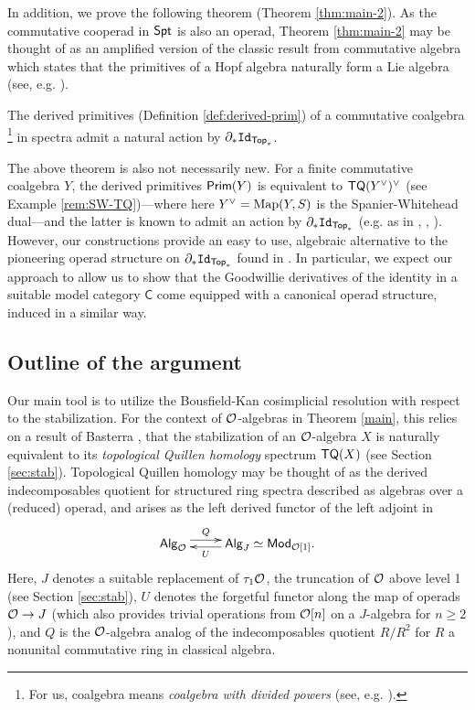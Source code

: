 In addition, we prove the following theorem (Theorem \ref{thm:main-2}). As the commutative cooperad in $\mathsf{Spt}$ is also an operad, Theorem \ref{thm:main-2} may be thought of as an amplified version of the classic result from commutative algebra which states that the primitives of a Hopf algebra naturally form a Lie algebra (see, e.g. \cite{Abe}). 

\begin{theorem} \label{thm:main-2}
    The derived primitives (Definition \ref{def:derived-prim}) of a commutative coalgebra \footnote{For us, coalgebra means \textit{coalgebra with divided powers} (see, e.g. \cite{FG}).} in spectra admit a natural action by $\partial_*\mathtt{Id}_{\mathsf{Top}_*}$. 
\end{theorem}

The above theorem is also not necessarily new. For a finite commutative coalgebra $Y$, the derived primitives $\operatorname{\mathsf{Prim}}(Y)$ is equivalent to $\mathsf{TQ}(Y^{\vee})^{\vee}$ (see Example \ref{rem:SW-TQ})---where here $Y^{\vee}=\operatorname{Map}(Y,S)$ is the Spanier-Whitehead dual---and the latter is known to admit an action by $\partial_* \mathtt{Id}_{\mathsf{Top}_*}$ (e.g. as in \cite{Ching-thesis}, \cite{BR}, \cite{Heuts-vn}).  However, our constructions provide an easy to use, algebraic alternative to the pioneering operad structure on $\partial_*\mathtt{Id}_{\mathsf{Top}_*}$ found in \cite{Ching-thesis}. In particular, we expect our approach to allow us to show that the Goodwillie derivatives of the identity in a suitable model category $\mathsf{C}$ come equipped with a canonical operad structure, induced in a similar way. 


\subsection{Outline of the argument}
Our main tool is to utilize the Bousfield-Kan cosimplicial resolution with respect to the stabilization. For the context of $\mathcal{O}$-algebras in Theorem \ref{main}, this relies on a result of Basterra \cite{Bast}, that the stabilization of an $\mathcal{O}$-algebra $X$ is naturally equivalent to its \textit{topological Quillen homology} spectrum $\mathsf{TQ}(X)$ (see Section \ref{sec:stab}). Topological Quillen homology may be thought of as the derived indecomposables quotient for structured ring spectra described as algebras over a (reduced) operad, and arises as the left derived functor of the left adjoint in \[ \xymatrix{
    \Alg{O} \ar@<.75ex>[r]^-{Q} & \textsf{Alg}_{J}\simeq \mathsf{Mod}_{\Cal{O}[1]}. \ar@<.5ex>[l]^-{U}
    }\] 
Here, $J$ denotes a suitable replacement of $\tau_1\mathcal{O}$, the truncation of $\mathcal{O}$ above level 1 (see Section \ref{sec:stab}), $U$ denotes the forgetful functor along the map of operads $\mathcal{O}\to J$ (which also provides trivial operations from $\mathcal{O}[n]$ on a $J$-algebra for $n\geq 2$), and $Q$ is the $\mathcal{O}$-algebra analog of the indecomposables quotient $R/R^2$ for $R$ a nonunital commutative ring in classical algebra. 


